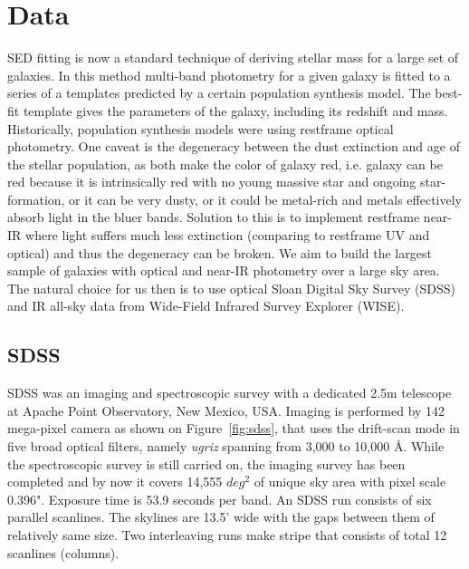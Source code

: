 \chapter{Data}\label{CH_01}

SED fitting is now a standard technique of deriving stellar mass for a large set of galaxies. In this method multi-band photometry for a given galaxy is fitted to a series of a templates predicted by a certain population synthesis model. The best-fit template gives the parameters of the galaxy, including its redshift and mass.
Historically, population synthesis models were using restframe optical photometry. One caveat is the degeneracy between the dust extinction and age of the stellar population, as both make the color of galaxy red, i.e. galaxy can be red because it is intrinsically red with no young massive star and ongoing star-formation, or it can be very dusty, or it could be metal-rich and metals effectively absorb light in the bluer bands. Solution to this is to implement restframe near-IR where light suffers much less extinction (comparing to restframe UV and optical) and thus the degeneracy can be broken.
We aim to build the largest sample of galaxies with optical and near-IR photometry over a large sky area. The natural choice for us then is to use optical Sloan Digital Sky Survey (SDSS) and IR all-sky data from Wide-Field Infrared Survey Explorer (WISE).

\section{SDSS}
SDSS \citep{York2000} was an imaging and spectroscopic survey with a dedicated 2.5m telescope at Apache Point Observatory, New Mexico, USA. Imaging is performed by 142 mega-pixel camera as shown on Figure~\ref{fig:sdss}, that uses the drift-scan mode in five broad optical filters, namely \textit{ugriz} \citep{1998AJ....116.3040G} spanning from 3,000 to 10,000 {\AA}. While the spectroscopic survey is still carried on, the imaging survey has been completed and by now it covers 14,555 $deg^{2}$ of unique sky area with pixel scale 0.396". Exposure time is 53.9 seconds per band. An SDSS run consists of six parallel scanlines. The skylines are 13.5' wide with the gaps between them of relatively same size. Two interleaving runs make stripe that consists of total 12 scanlines (columns).

